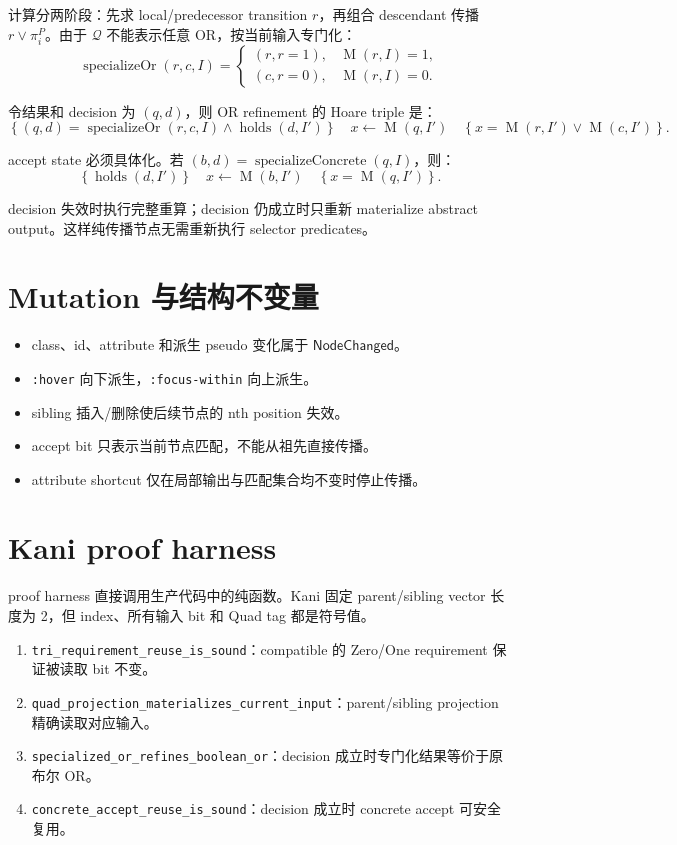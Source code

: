 \documentclass[UTF8,11pt]{ctexart}
\newcommand{\NodeChanged}{\ensuremath{\mathsf{NodeChanged}}}
\newcommand{\mat}{\ensuremath{\operatorname{M}}}
\begin{document}
计算分两阶段：先求 local/predecessor transition $r$，再组合 descendant
传播 $r\lor\pi^P_i$。由于 $\mathcal Q$ 不能表示任意 OR，按当前输入专门化：
\[
\operatorname{specializeOr}(r,c,I)=
\begin{cases}
(r,r=1),&\mat(r,I)=1,\\
(c,r=0),&\mat(r,I)=0.
\end{cases}
\]

令结果和 decision 为 $(q,d)$，则 OR refinement 的 Hoare triple 是：
\[
\left\{(q,d)=\operatorname{specializeOr}(r,c,I)
\land\operatorname{holds}(d,I')\right\}
\quad x\gets\mat(q,I')\quad
\left\{x=\mat(r,I')\lor\mat(c,I')\right\}.
\]

accept state 必须具体化。若
$(b,d)=\operatorname{specializeConcrete}(q,I)$，则：
\[
\left\{\operatorname{holds}(d,I')\right\}
\quad x\gets\mat(b,I')\quad
\left\{x=\mat(q,I')\right\}.
\]

decision 失效时执行完整重算；decision 仍成立时只重新 materialize abstract
output。这样纯传播节点无需重新执行 selector predicates。

\section{Mutation 与结构不变量}

\begin{itemize}
  \item class、id、attribute 和派生 pseudo 变化属于 \NodeChanged。
  \item \texttt{:hover} 向下派生，\texttt{:focus-within} 向上派生。
  \item sibling 插入/删除使后续节点的 nth position 失效。
  \item accept bit 只表示当前节点匹配，不能从祖先直接传播。
  \item attribute shortcut 仅在局部输出与匹配集合均不变时停止传播。
\end{itemize}

\section{Kani proof harness}

proof harness 直接调用生产代码中的纯函数。Kani 固定 parent/sibling vector
长度为 2，但 index、所有输入 bit 和 Quad tag 都是符号值。

\begin{enumerate}
  \item \nolinkurl{tri_requirement_reuse_is_sound}：compatible 的 Zero/One requirement 保证被读取 bit 不变。
  \item \nolinkurl{quad_projection_materializes_current_input}：parent/sibling projection 精确读取对应输入。
  \item \nolinkurl{specialized_or_refines_boolean_or}：decision 成立时专门化结果等价于原布尔 OR。
  \item \nolinkurl{concrete_accept_reuse_is_sound}：decision 成立时 concrete accept 可安全复用。
\end{enumerate}
\end{document}
